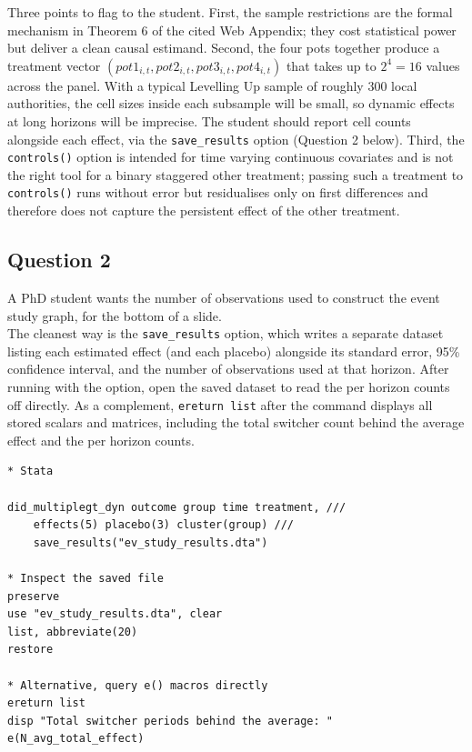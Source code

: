  Three points to flag to the student. First, the sample restrictions are the formal mechanism in Theorem 6 of the cited Web Appendix; they cost statistical power but deliver a clean causal estimand. Second, the four pots together produce a treatment vector $(pot1_{i,t}, pot2_{i,t}, pot3_{i,t}, pot4_{i,t})$ that takes up to $2^4 = 16$ values across the panel. With a typical Levelling Up sample of roughly 300 local authorities, the cell sizes inside each subsample will be small, so dynamic effects at long horizons will be imprecise. The student should report cell counts alongside each effect, via the \texttt{save\_results} option (Question 2 below). Third, the \texttt{controls()} option is intended for time varying continuous covariates and is not the right tool for a binary staggered other treatment; passing such a treatment to \texttt{controls()} runs without error but residualises only on first differences and therefore does not capture the persistent effect of the other treatment.

\subsection*{Question 2}

 A PhD student wants the number of observations used to construct the event study graph, for the bottom of a slide.\\

 The cleanest way is the \texttt{save\_results} option, which writes a separate dataset listing each estimated effect (and each placebo) alongside its standard error, 95\% confidence interval, and the number of observations used at that horizon. After running with the option, open the saved dataset to read the per horizon counts off directly. As a complement, \texttt{ereturn list} after the command displays all stored scalars and matrices, including the total switcher count behind the average effect and the per horizon counts.\\

\begin{lstlisting}
* Stata

did_multiplegt_dyn outcome group time treatment, ///
    effects(5) placebo(3) cluster(group) ///
    save_results("ev_study_results.dta")

* Inspect the saved file
preserve
use "ev_study_results.dta", clear
list, abbreviate(20)
restore

* Alternative, query e() macros directly
ereturn list
disp "Total switcher periods behind the average: " e(N_avg_total_effect)
\end{lstlisting}

